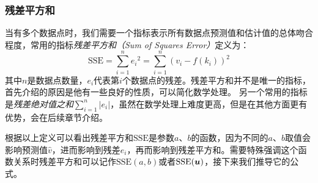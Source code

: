 \subsubsection{残差平方和}

当有多个数据点时，我们需要一个指标表示所有数据点预测值和估计值的总体吻合程度，常用的指标\emph{残差平方和（Sum of Squares Error）}定义为：
\begin{equation}\label{eq:sse}
    \text{SSE}=\sum_{i=1}^n {e_i}^2=\sum_{i=1}^n (v_i-f(k_i))^2
\end{equation}
其中$n$是数据点数量，$e_i$代表第$i$个数据点的残差。残差平方和并不是唯一的指标，首先介绍的原因是他有一些良好的性质，可以简化数学处理。
另一个常用的指标是\emph{残差绝对值之和}$\sum_{i=1}^{n}|e_i|$，虽然在数学处理上难度更高，但是在其他方面更有优势，会在后续章节介绍。

根据以上定义可以看出残差平方和$\text{SSE}$是参数$a$、$b$的函数，因为不同的$a$、$b$取值会影响预测值$\hat{v}$，进而影响到残差$e_i$，再而影响到残差平方和。需要特殊强调这个函数关系时残差平方和可以记作$\text{SSE}(a,b)$或者$\text{SSE}(\bm{u})$，接下来我们推导它的公式。

